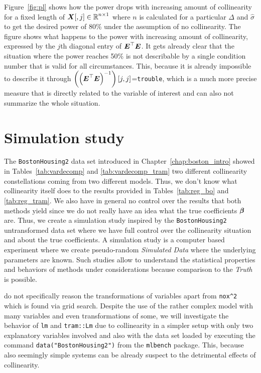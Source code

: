 \documentclass[11pt,a4paper,twoside]{book}\usepackage[]{graphicx}\usepackage[]{xcolor}
\begin{document}
Figure~\ref{fig:pl} shows how the power drops with increasing amount of collinearity for a fixed length of ${\boldsymbol{X}}[,j]\in\operatorname{\mathbb{R}}^{n\times 1}$ where $n$ is calculated for a particular $\Delta$ and $\hat\sigma$ to get the desired power of 80\% under the assumption of no collinearity. The figure shows what happens to the power with increasing amount of collinearity, expressed by the $j$th diagonal entry of ${\boldsymbol{E}}^\top{\boldsymbol{E}}$. It gets already clear that the situation where the power reaches 50\% is not describable by a single condition number that is valid for all circumstances.
This, because it is already impossible to describe it through $\left(\left({\boldsymbol{E}}^\top{\boldsymbol{E}}\right)^{-1}\right)[j,j]$=\texttt{trouble}, which is a much more precise measure that is directly related to the variable of interest and can also not summarize the whole situation.





\chapter{Simulation study}\label{simstudy}




The \texttt{BostonHousing2} data set introduced in Chapter~\ref{chap:boston_intro} showed in Tables~\ref{tab:vardecomp} and \ref{tab:vardecomp_tram} two different collinearity constellations coming from two different models. Thus, we don't know what collinearity itself does to the results provided in Tables~\ref{tab:reg_bo} and \ref{tab:reg_tram}. We also have in general no control over the results that both methods yield since we do not really have an idea what the true coefficients ${\boldsymbol{\beta}}$ are. Thus, we create a simulation study inspired by the \texttt{BostonHousing2} untransformed data set where we have full control over the collinearity situation and about the true coefficients. A simulation study is a computer based experiment where we create pseudo-random \textit{Simulated Data} where the underlying parameters are known. Such studies allow to understand the statistical properties and behaviors of methods under considerations because comparison to the \textit{Truth} is possible. 

\cite{Harrison1978} do not specifically reason the transformations of variables apart from \texttt{nox\textasciicircum 2} which is found via grid search. Despite the use of the rather complex model with many variables and even transformations of some, we will investigate the behavior of \texttt{lm} and \texttt{tram::Lm} due to collinearity in a simpler setup with only two explanatory variables involved and also with the data set loaded by executing the command \texttt{data("BostonHousing2")} from the \texttt{mlbench} package. This, because also seemingly simple systems can be already suspect to the detrimental effects of collinearity.
\end{document}
